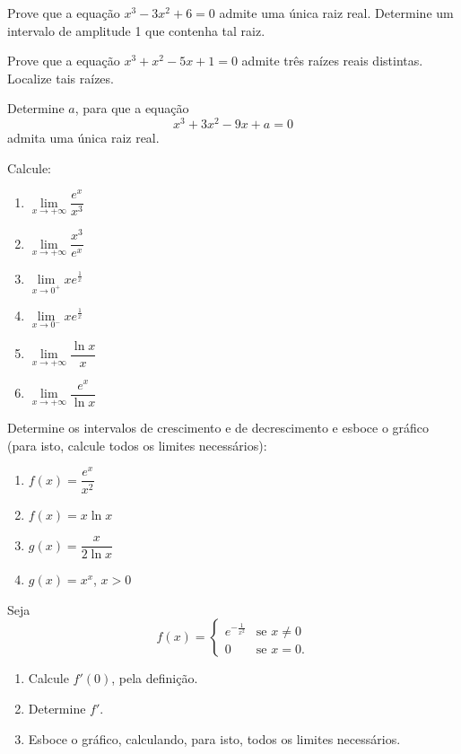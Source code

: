 \begin{exercicio}[2]
Prove que a equação $x^3 - 3x^2 + 6 = 0$ admite uma única raiz real. Determine um intervalo de amplitude 1 que contenha tal raiz.
\end{exercicio}

\begin{exercicio}[3]
Prove que a equação $x^3 + x^2 - 5x + 1 = 0$ admite três raízes reais distintas. Localize tais raízes.
\end{exercicio}

\begin{exercicio}[4]
Determine $a$, para que a equação
\[
x^3 + 3x^2 - 9x + a = 0
\]
admita uma única raiz real.
\end{exercicio}

\begin{exercicio}[5]
Calcule:
\begin{enumerate}[label=\alph*)]
    \item $\lim\limits_{x \to +\infty} \dfrac{e^x}{x^3}$
    \item $\lim\limits_{x \to +\infty} \dfrac{x^3}{e^x}$
    \item $\lim\limits_{x \to 0^+} x e^{\frac{1}{x}}$
    \item $\lim\limits_{x \to 0^-} x e^{\frac{1}{x}}$
    \item $\lim\limits_{x \to +\infty} \dfrac{\ln x}{x}$
    \item $\lim\limits_{x \to +\infty} \dfrac{e^x}{\ln x}$
\end{enumerate}
\end{exercicio}

\begin{exercicio}[6]
Determine os intervalos de crescimento e de decrescimento e esboce o gráfico (para isto, calcule todos os limites necessários):
\begin{enumerate}[label=\alph*)]
    \item $f(x) = \dfrac{e^x}{x^2}$
    \item $f(x) = x \ln x$
    \item $g(x) = \dfrac{x}{2 \ln x}$
    \item $g(x) = x^x$, $x > 0$
\end{enumerate}
\end{exercicio}

\begin{exercicio}[7]
Seja
\[
f(x) = \begin{cases}
e^{-\frac{1}{x^2}} & \text{se } x \neq 0 \\
0 & \text{se } x = 0.
\end{cases}
\]
\begin{enumerate}[label=\alph*)]
    \item Calcule $f'(0)$, pela definição.
    \item Determine $f'$.
    \item Esboce o gráfico, calculando, para isto, todos os limites necessários.
\end{enumerate}
\end{exercicio}


